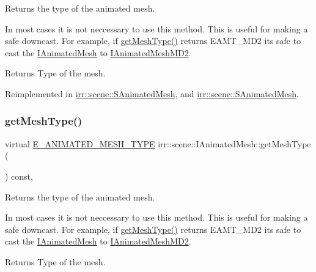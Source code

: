 Returns the type of the animated mesh. 

In most cases it is not neccessary to use this method. This is useful for making a safe downcast. For example, if \hyperlink{classirr_1_1scene_1_1IAnimatedMesh_abe5a20eccfb94eefcc6cbbc0b667ce37}{get\+Mesh\+Type()} returns E\+A\+M\+T\+\_\+\+M\+D2 it\textquotesingle{}s safe to cast the \hyperlink{classirr_1_1scene_1_1IAnimatedMesh}{I\+Animated\+Mesh} to \hyperlink{classirr_1_1scene_1_1IAnimatedMeshMD2}{I\+Animated\+Mesh\+M\+D2}. \begin{DoxyReturn}{Returns}
Type of the mesh. 
\end{DoxyReturn}


Reimplemented in \hyperlink{structirr_1_1scene_1_1SAnimatedMesh_a423a3a9a7d2075eac53280fdfb15fdc9}{irr\+::scene\+::\+S\+Animated\+Mesh}, and \hyperlink{structirr_1_1scene_1_1SAnimatedMesh_a423a3a9a7d2075eac53280fdfb15fdc9}{irr\+::scene\+::\+S\+Animated\+Mesh}.

\mbox{\label{classirr_1_1scene_1_1IAnimatedMesh_abe5a20eccfb94eefcc6cbbc0b667ce37}} 
\subsubsection{\texorpdfstring{get\+Mesh\+Type()}{getMeshType()}\hspace{0.1cm}{\footnotesize\ttfamily [2/2]}}
{\footnotesize\ttfamily virtual \hyperlink{namespaceirr_1_1scene_a2fc85a64604521ca063f1881b5dd1c61}{E\+\_\+\+A\+N\+I\+M\+A\+T\+E\+D\+\_\+\+M\+E\+S\+H\+\_\+\+T\+Y\+PE} irr\+::scene\+::\+I\+Animated\+Mesh\+::get\+Mesh\+Type (\begin{DoxyParamCaption}{ }\end{DoxyParamCaption}) const\hspace{0.3cm}{\ttfamily [inline]}, {\ttfamily [virtual]}}



Returns the type of the animated mesh. 

In most cases it is not neccessary to use this method. This is useful for making a safe downcast. For example, if \hyperlink{classirr_1_1scene_1_1IAnimatedMesh_abe5a20eccfb94eefcc6cbbc0b667ce37}{get\+Mesh\+Type()} returns E\+A\+M\+T\+\_\+\+M\+D2 it\textquotesingle{}s safe to cast the \hyperlink{classirr_1_1scene_1_1IAnimatedMesh}{I\+Animated\+Mesh} to \hyperlink{classirr_1_1scene_1_1IAnimatedMeshMD2}{I\+Animated\+Mesh\+M\+D2}. \begin{DoxyReturn}{Returns}
Type of the mesh. 
\end{DoxyReturn}


